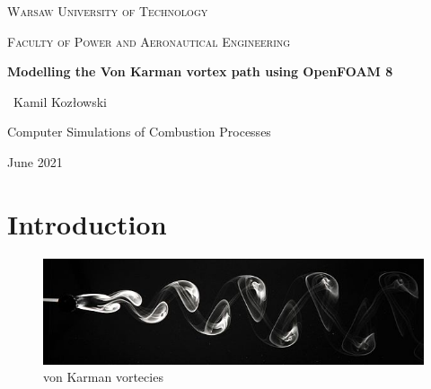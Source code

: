 \documentclass[a4paper,11pt]{article}
\begin{document}
\begin{titlepage}
	\centering
	{\scshape\LARGE Warsaw University of Technology \par}
	\vspace{1cm}
	{\scshape\Large Faculty of Power and Aeronautical Engineering\par}
	\vspace{5cm}
	{\huge\bfseries Modelling the Von Karman vortex path using OpenFOAM 8\par}
	\vspace{5cm}
	{\Large\ Kamil Kozłowski\par}
	\vfill
	Computer Simulations of Combustion Processes\par
	\vfill

	{\large June 2021\par}
\end{titlepage}

\tableofcontents
\newpage



\section{Introduction}
  
 
\begin{figure}[h]
\centering
\includegraphics[width=12cm]{vortecies.JPG}
\caption{von Karman vortecies}
\end{figure}
\end{document}
